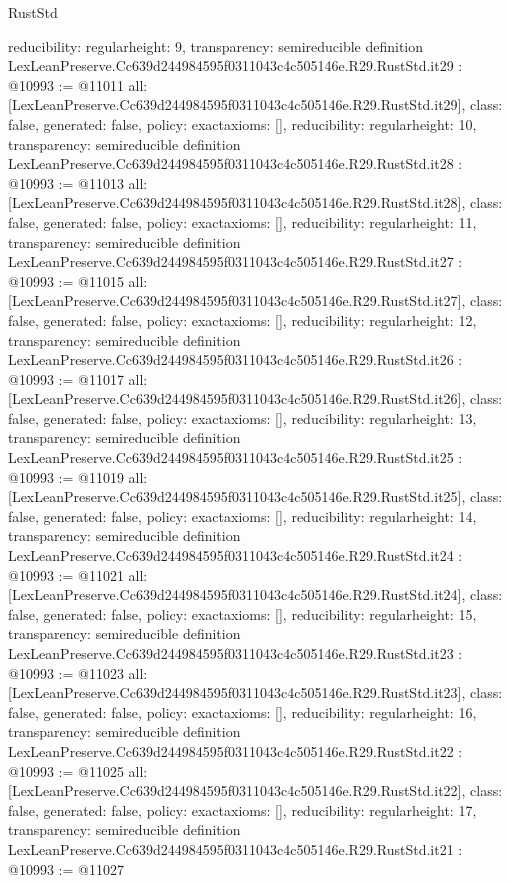 \begin{lexlean}{RustStd}
\begin{coremodule}
{  reducibility: regular{height: 9},
  transparency: semireducible
}
definition LexLeanPreserve.Cc639d244984595f0311043c4c505146e.R29.RustStd.it29 : @10993 := @11011 {
  all: [LexLeanPreserve.Cc639d244984595f0311043c4c505146e.R29.RustStd.it29],
  class: false,
  generated: false,
  policy: exact{axioms: []},
  reducibility: regular{height: 10},
  transparency: semireducible
}
definition LexLeanPreserve.Cc639d244984595f0311043c4c505146e.R29.RustStd.it28 : @10993 := @11013 {
  all: [LexLeanPreserve.Cc639d244984595f0311043c4c505146e.R29.RustStd.it28],
  class: false,
  generated: false,
  policy: exact{axioms: []},
  reducibility: regular{height: 11},
  transparency: semireducible
}
definition LexLeanPreserve.Cc639d244984595f0311043c4c505146e.R29.RustStd.it27 : @10993 := @11015 {
  all: [LexLeanPreserve.Cc639d244984595f0311043c4c505146e.R29.RustStd.it27],
  class: false,
  generated: false,
  policy: exact{axioms: []},
  reducibility: regular{height: 12},
  transparency: semireducible
}
definition LexLeanPreserve.Cc639d244984595f0311043c4c505146e.R29.RustStd.it26 : @10993 := @11017 {
  all: [LexLeanPreserve.Cc639d244984595f0311043c4c505146e.R29.RustStd.it26],
  class: false,
  generated: false,
  policy: exact{axioms: []},
  reducibility: regular{height: 13},
  transparency: semireducible
}
definition LexLeanPreserve.Cc639d244984595f0311043c4c505146e.R29.RustStd.it25 : @10993 := @11019 {
  all: [LexLeanPreserve.Cc639d244984595f0311043c4c505146e.R29.RustStd.it25],
  class: false,
  generated: false,
  policy: exact{axioms: []},
  reducibility: regular{height: 14},
  transparency: semireducible
}
definition LexLeanPreserve.Cc639d244984595f0311043c4c505146e.R29.RustStd.it24 : @10993 := @11021 {
  all: [LexLeanPreserve.Cc639d244984595f0311043c4c505146e.R29.RustStd.it24],
  class: false,
  generated: false,
  policy: exact{axioms: []},
  reducibility: regular{height: 15},
  transparency: semireducible
}
definition LexLeanPreserve.Cc639d244984595f0311043c4c505146e.R29.RustStd.it23 : @10993 := @11023 {
  all: [LexLeanPreserve.Cc639d244984595f0311043c4c505146e.R29.RustStd.it23],
  class: false,
  generated: false,
  policy: exact{axioms: []},
  reducibility: regular{height: 16},
  transparency: semireducible
}
definition LexLeanPreserve.Cc639d244984595f0311043c4c505146e.R29.RustStd.it22 : @10993 := @11025 {
  all: [LexLeanPreserve.Cc639d244984595f0311043c4c505146e.R29.RustStd.it22],
  class: false,
  generated: false,
  policy: exact{axioms: []},
  reducibility: regular{height: 17},
  transparency: semireducible
}
definition LexLeanPreserve.Cc639d244984595f0311043c4c505146e.R29.RustStd.it21 : @10993 := @11027 {
}
\end{coremodule}
\end{lexlean}
